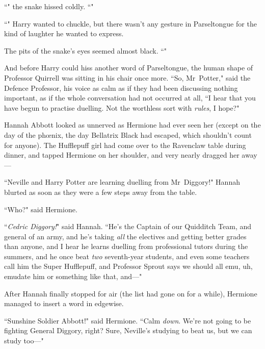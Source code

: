 ``" the snake hissed coldly. ``"

``" Harry wanted to chuckle, but there wasn't any gesture in Parseltongue for the kind of laughter he wanted to express.

The pits of the snake's eyes seemed almost black. ``"

And before Harry could hiss another word of Parseltongue, the human shape of Professor Quirrell was sitting in his chair once more. ``So, Mr~Potter," said the Defence Professor, his voice as calm as if they had been discussing nothing important, as if the whole conversation had not occurred at all, ``I hear that you have begun to practise duelling. Not the worthless sort with \emph{rules}, I hope?"

\later

Hannah Abbott looked as unnerved as Hermione had ever seen her (except on the day of the phœnix, the day Bellatrix Black had escaped, which shouldn't count for anyone). The Hufflepuff girl had come over to the Ravenclaw table during dinner, and tapped Hermione on her shoulder, and very nearly dragged her away—

``Neville and Harry Potter are learning duelling from Mr~Diggory!" Hannah blurted as soon as they were a few steps away from the table.

``Who?" said Hermione.

``\emph{Cedric Diggory!}" said Hannah. ``He's the Captain of our Quidditch Team, and general of an army, and he's taking \emph{all} the electives and getting better grades than anyone, and I hear he learns duelling from professional tutors during the summers, and he once beat \emph{two} seventh-year students, and even some teachers call him the Super Hufflepuff, and Professor Sprout says we should all emu, uh, emudate him or something like that, and—"

After Hannah finally stopped for air (the list had gone on for a while), Hermione managed to insert a word in edgewise.

``Sunshine Soldier Abbott!" said Hermione. ``Calm \emph{down}. We're not going to be fighting General Diggory, right? Sure, Neville's studying to beat us, but we can study too—"

